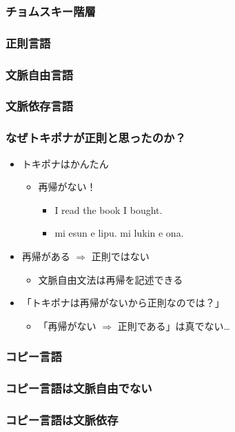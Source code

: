 \documentclass[14pt]{beamer}
\theoremstyle{definition}
\begin{document}
\begin{frame}
	\frametitle{チョムスキー階層}
\end{frame}


\begin{frame}
	\frametitle{正則言語}
\end{frame}


\begin{frame}
	\frametitle{文脈自由言語}
\end{frame}


\begin{frame}
	\frametitle{文脈依存言語}
\end{frame}


\begin{frame}
	\frametitle{なぜトキポナが正則と思ったのか？}

	\begin{itemize}
		\item トキポナはかんたん
			\begin{itemize}
				\item 再帰がない！
					\begin{itemize}
						\item I read the book I bought.
						\item mi esun e lipu. mi lukin e ona.
					\end{itemize}
			\end{itemize}
		\item 再帰がある $\Rightarrow$ 正則ではない
			\begin{itemize}
				\item 文脈自由文法は再帰を記述できる
			\end{itemize}
		\item 「トキポナは再帰がないから正則なのでは？」
			\begin{itemize}
				\item {\color{gray} \small「再帰がない $\Rightarrow$ 正則である」は真でない…}
			\end{itemize}
	\end{itemize}

\end{frame}


\begin{frame}
	\frametitle{コピー言語}
\end{frame}


\begin{frame}
	\frametitle{コピー言語は文脈自由でない}
\end{frame}


\begin{frame}
	\frametitle{コピー言語は文脈依存}
\end{frame}
\end{document}

